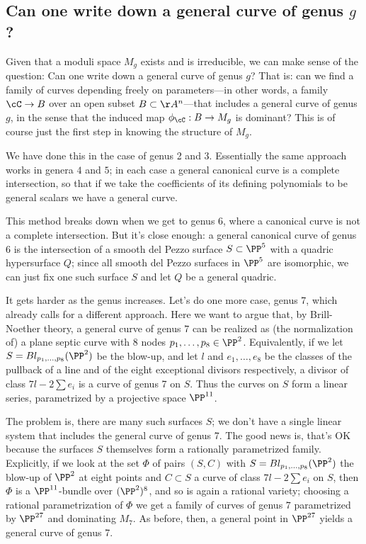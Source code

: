 \subsection{Can one write down a general curve of genus $g$?}


Given that a moduli space $M_g$ exists and is irreducible, we can make sense of the question: Can one write down a general curve of genus $g$?
That is: can we find a family of curves depending freely on parameters---in other words, a family $\cC \to B$ over an open subset $B \subset \AA^n$---that includes a general curve of genus $g$, in the sense that the induced map $\phi_\cC : B \to M_g$ is dominant? This is of course just the first step in knowing the structure of $M_g$.

We have done this in the case of genus 2 and 3. Essentially
the same approach works in genera $4$ and $5$; in each case a general canonical curve is a complete intersection, so that if we take the coefficients of its defining polynomials to be general scalars we have a general curve.

This method breaks down when we get to genus 6, where a canonical curve is not a complete intersection. But it's close enough: a general canonical curve of genus 6 is the intersection of a smooth del Pezzo surface $S \subset \PP^5$ with a quadric hypersurface $Q$; since all smooth del Pezzo surfaces in $\PP^5$ are isomorphic, we can just fix one such surface $S$ and let $Q$ be a general quadric.

It gets harder as the genus increases. Let's do one more case, genus 7, which already calls for a different approach. Here we want to argue that, by Brill-Noether theory, a general curve of genus $7$ can be realized as (the normalization of) a plane septic curve with 8 nodes $p_1,\dots,p_8 \in \PP^2$. Equivalently, if we let $S = Bl_{p_1,\dots,p_8}(\PP^2)$ be the blow-up, and let $l$ and $e_1,\dots,e_8$ be the classes of the pullback of a line and of the eight exceptional divisors respectively, a divisor of class $7l - 2 \sum e_i$ is a curve of genus 7 on $S$. Thus the curves on $S$ form a linear series, parametrized by a projective space $\PP^{11}$.

The problem is, there are many such surfaces $S$; we don't have a single linear system that includes the general curve of genus 7. The good news is, that's OK because the surfaces $S$ themselves form a rationally parametrized family. Explicitly, if we look at the set $\Phi$ of pairs $(S, C)$ with $S = Bl_{p_1,\dots,p_8}(\PP^2)$  the blow-up of $\PP^2$ at eight points and $C \subset S$ a curve of class $7l - 2 \sum e_i$ on $S$, then $\Phi$ is a $\PP^{11}$-bundle over $(\PP^2)^8$, and so is again a rational variety; choosing a rational parametrization of $\Phi$ we get a family of curves of genus $7$ parametrized by $\PP^{27}$ and dominating $M_7$. As before, then, a general point in $\PP^{27}$ yields a general curve of genus 7.

